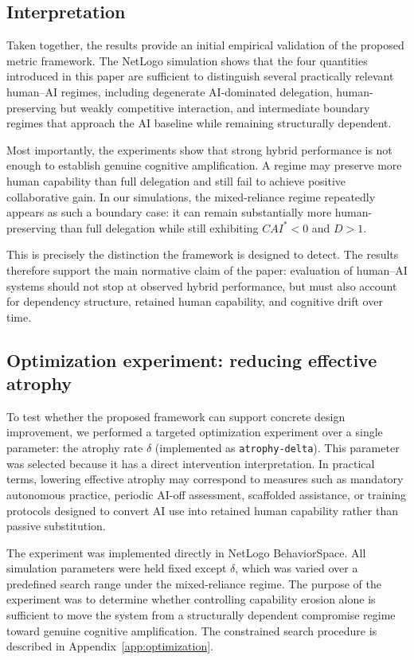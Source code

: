 \documentclass[11pt,a4paper]{article}
\begin{document}
\subsection{Interpretation}

Taken together, the results provide an initial empirical validation of the proposed metric framework. The NetLogo simulation shows that the four quantities introduced in this paper are sufficient to distinguish several practically relevant human--AI regimes, including degenerate AI-dominated delegation, human-preserving but weakly competitive interaction, and intermediate boundary regimes that approach the AI baseline while remaining structurally dependent.

Most importantly, the experiments show that strong hybrid performance is not enough to establish genuine cognitive amplification. A regime may preserve more human capability than full delegation and still fail to achieve positive collaborative gain. In our simulations, the mixed-reliance regime repeatedly appears as such a boundary case: it can remain substantially more human-preserving than full delegation while still exhibiting $CAI^*<0$ and $D>1$.

This is precisely the distinction the framework is designed to detect. The results therefore support the main normative claim of the paper: evaluation of human--AI systems should not stop at observed hybrid performance, but must also account for dependency structure, retained human capability, and cognitive drift over time.

\subsection{Optimization experiment: reducing effective atrophy}

To test whether the proposed framework can support concrete design improvement, we performed a targeted optimization experiment over a single parameter: the atrophy rate $\delta$ (implemented as \texttt{atrophy-delta}). This parameter was selected because it has a direct intervention interpretation. In practical terms, lowering effective atrophy may correspond to measures such as mandatory autonomous practice, periodic AI-off assessment, scaffolded assistance, or training protocols designed to convert AI use into retained human capability rather than passive substitution.

The experiment was implemented directly in NetLogo BehaviorSpace. All simulation parameters were held fixed except $\delta$, which was varied over a predefined search range under the mixed-reliance regime. The purpose of the experiment was to determine whether controlling capability erosion alone is sufficient to move the system from a structurally dependent compromise regime toward genuine cognitive amplification. The constrained search procedure is described in Appendix~\ref{app:optimization}.
\end{document}
